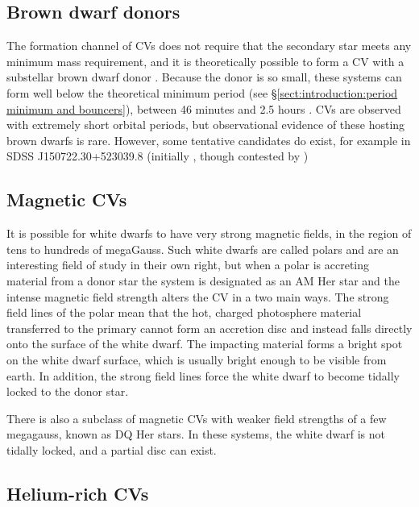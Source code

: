 \subsection{Brown dwarf donors}
\label{sect:introduction:brown dwarf donors}

The formation channel of CVs does not require that the secondary star meets any minimum mass requirement, and it is theoretically possible to form a CV with a substellar brown dwarf donor \citep{politano2002,politano2004}. Because the donor is so small, these systems can form well below the theoretical minimum period (see \S\ref{sect:introduction:period minimum and bouncers}), between 46 minutes and 2.5 hours \citep{politano2004}. CVs are observed with extremely short orbital periods, but observational evidence of these hosting brown dwarfs is rare. However, some tentative candidates do exist, for example in SDSS J150722.30+523039.8 (initially \citealt{littlefair2007}, though contested by \citealt{uthas2011})

\subsection{Magnetic CVs}
\label{sect:introduction:magnetic CVs}

It is possible for white dwarfs to have very strong magnetic fields, in the region of tens to hundreds of megaGauss. Such white dwarfs are called polars and are an interesting field of study in their own right, but when a polar is accreting material from a donor star the system is designated as an AM Her star and the intense magnetic field strength alters the CV in a two main ways. The strong field lines of the polar mean that the hot, charged photosphere material transferred to the primary cannot form an accretion disc and instead falls directly onto the surface of the white dwarf. The impacting material forms a bright spot on the white dwarf surface, which is usually bright enough to be visible from earth. In addition, the strong field lines force the white dwarf to become tidally locked to the donor star. 

There is also a subclass of magnetic CVs with weaker field strengths of a few megagauss, known as DQ Her stars. In these systems, the white dwarf is not tidally locked, and a partial disc can exist.

\subsection{Helium-rich CVs}
\label{sect:introduction:AM CVn}

